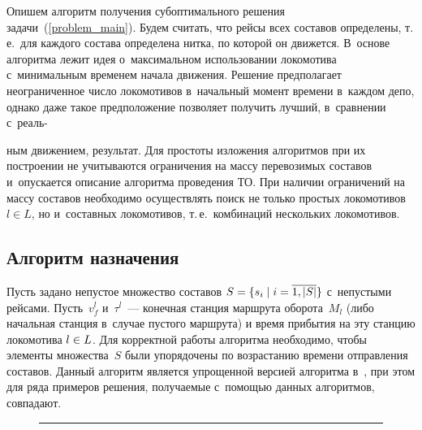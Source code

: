 \begin{multicols}{2}
\vspace*{-2pt}

Опишем алгоритм получения субоптимального решения задачи~(\ref{problem_main}).
Будем считать, что рейсы всех составов определены, т.\,е.\ для каждого состава 
определена нитка,
по которой он движется. В~основе алгоритма лежит идея о~максимальном использовании 
локомотива
с~минимальным временем начала движения. Решение предполагает неограниченное число 
локомотивов
в~начальный момент времени в~каждом депо, однако даже такое предположение 
позволяет получить лучший,
в~сравнении с~реаль-\linebreak\vspace*{-12pt}

\pagebreak

\noindent
ным движением, результат.
Для простоты изложения алгоритмов при их построении не учитываются 
ограничения на массу перевозимых составов и~опускается описание алгоритма проведения 
ТО. При наличии ограничений на массу составов необходимо осуществлять поиск не только простых локомотивов $l\in L$,
но и~составных локомотивов, т.\,е.\ комбинаций нескольких локомотивов.

\vspace*{-6pt}
    
\subsection{Алгоритм назначения} \label{find1}

\vspace*{-2pt}
    
Пусть задано непустое множество составов $S \hm= \{s_i\mid i = \overline{1, |S|}\}$ 
с~непустыми рейсами.
Пусть~$v^l_f$ и~$\tau^l$~--- конечная станция маршрута оборота~$M_l$ (либо начальная станция в~случае пустого маршрута)
и время прибытия на эту станцию локомотива $l\hm\in L$. Для корректной работы алгоритма 
необходимо,
чтобы элементы множества~$S$ были упорядочены по возрастанию времени отправления составов.
Данный алгоритм является упрощенной версией алгоритма в~\cite{AzanovBuyanov},
при этом для ряда примеров решения, получаемые с~по\-мощью данных алгоритмов, совпадают.
    
\renewcommand{\figurename}{\protect\bf Алгоритм}

\begin{figure*} 
\hrule

\vspace*{-4pt}

\Caption{\ }  


\end{figure*}
\end{multicols}
